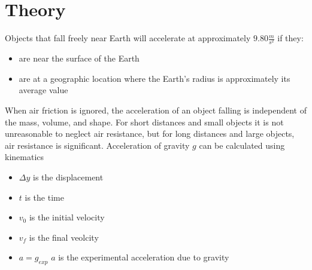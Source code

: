 \chapter{Theory}
Objects that fall freely near Earth will accelerate at approximately $9.80\frac{m}{s^2}$
if they:
\begin{itemize}
  \item are near the surface of the Earth
  \item are at a geographic location where the Earth's radius is approximately its average value
\end{itemize}

  When air friction is ignored, the acceleration of an object falling is 
independent of the mass, volume, and shape. For short distances and small 
objects it is not unreasonable to neglect air resistance, but for long 
distances and large objects, air resistance is significant.
Acceleration of gravity $g$ can be calculated using kinematics

\begin{itemize}
  \item $\Delta y$ is the displacement
  \item $t$ is the time
  \item $v_0$ is the initial velocity
  \item $v_f$ is the final veolcity
  \item $a = g_{exp}$ $a$ is the experimental acceleration due to gravity
\end{itemize}

